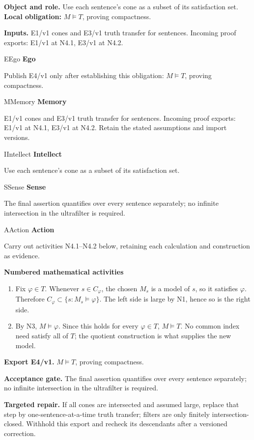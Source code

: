 \documentclass[preprint,12pt,aps,pra,showkeys,amsmath,amssymb,superscriptaddress,floatfix]{revtex4-2}
\theoremstyle{definition}
\theoremstyle{remark}
\newcommand{\mmfaculty}[3]{%
 \begin{mmfacultybox}{#1}{#2}
 {\sffamily\bfseries\color{MMBlue}#2}\par\smallskip #3
 \end{mmfacultybox}}
\newcommand{\field}[2]{\par\smallskip\noindent\textbf{#1.} #2\par}
\begin{document}
\field{Object and role}{Use each sentence's cone as a subset of its satisfaction set.
\textbf{Local obligation:} \(M\models T\), proving compactness.}

\field{Inputs}{E1/v1 cones and E3/v1 truth transfer for sentences. Incoming proof
exports: E1/v1 at N4.1, E3/v1 at N4.2.}

\mmfaculty{E}{Ego}{Publish E4/v1 only after establishing this obligation: \(M\models T\),
proving compactness.}

\mmfaculty{M}{Memory}{E1/v1 cones and E3/v1 truth transfer for sentences. Incoming proof
exports: E1/v1 at N4.1, E3/v1 at N4.2. Retain the stated assumptions and
import versions.}

\mmfaculty{I}{Intellect}{Use each sentence's cone as a subset of its satisfaction set.}

\mmfaculty{S}{Sense}{The final assertion quantifies over every sentence separately; no
infinite intersection in the ultrafilter is required.}

\mmfaculty{A}{Action}{Carry out activities N4.1--N4.2 below, retaining each calculation and
construction as evidence.}

\smallskip\noindent\textbf{Numbered mathematical activities}

\begin{enumerate}[label=N4.\arabic*,leftmargin=3.4em]

\item Fix \(\varphi\in T\). Whenever \(s\in C_\varphi\), the chosen \(M_s\) is
a model of \(s\), so it satisfies \(\varphi\). Therefore
\(C_\varphi\subset\{s:M_s\models\varphi\}\). The left side is large by
N1, hence so is the right side.

\item By N3, \(M\models\varphi\). Since this holds for every \(\varphi\in T\),
\(M\models T\). No common index need satisfy all of \(T\); the quotient
construction is what supplies the new model.

\end{enumerate}

\field{Export E4/v1}{\(M\models T\), proving compactness.}

\field{Acceptance gate}{The final assertion quantifies over every sentence separately; no
infinite intersection in the ultrafilter is required.}

\field{Targeted repair}{If all cones are intersected and assumed large, replace that step by
one-sentence-at-a-time truth transfer; filters are only finitely
intersection-closed. Withhold this export and recheck its descendants
after a versioned correction.}
\end{document}
